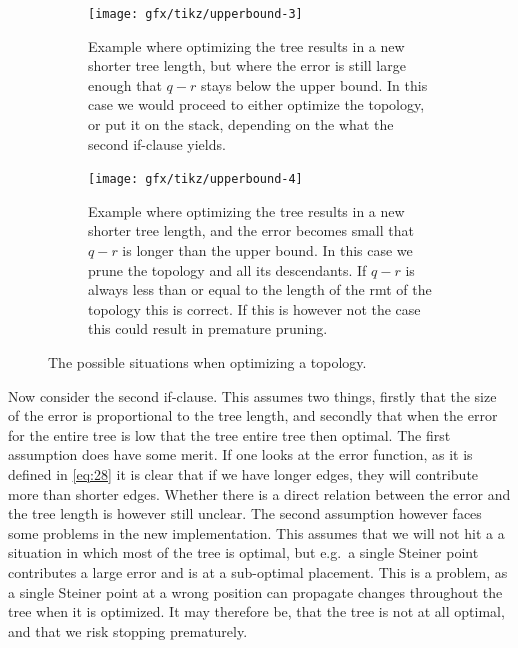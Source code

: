 \begin{figure}[htbp]
  \centering
  \begin{subfigure}[t]{0.4\textwidth}
    \texttt{[image: gfx/tikz/upperbound-3]}
    \caption{Example where optimizing the tree results in a new shorter tree length,
      but where the error is still large enough that $q-r$ stays below the upper
      bound. In this case we would proceed to either optimize the topology, or
      put it on the stack, depending on the what the second if-clause
      yields.\label{fig:upperbound-3}}
  \end{subfigure}\hspace{1em}
  \begin{subfigure}[t]{0.4\textwidth}
    \texttt{[image: gfx/tikz/upperbound-4]}
    \caption{Example where optimizing the tree results in a new shorter tree length,
      and the error becomes small that $q-r$ is longer than the upper bound. In
      this case we prune the topology and all its descendants. If $q-r$ is
      always less than or equal to the length of the \ac{rmt} of the topology
      this is correct. If this is however not the case this could result in
      premature pruning.\label{fig:upperbound-4}}
  \end{subfigure}
  \caption[Upper bounds, 3 and 4]{The possible situations when optimizing a
    topology.\label{fig:upperbound-3-4}}
\end{figure}

Now consider the second if-clause. This assumes two things, firstly that the
size of the error is proportional to the tree length, and secondly that when the
error for the entire tree is low that the tree entire tree then optimal. The
first assumption does have some merit. If one looks at the error function, as it
is defined in \cref{eq:28} it is clear that if we have longer edges, they will
contribute more than shorter edges. Whether there is a direct relation between
the error and the tree length is however still unclear. The second assumption
however faces some problems in the new implementation. This assumes that we will
not hit a a situation in which most of the tree is optimal, but e.g.\ a single
Steiner point contributes a large error and is at a sub-optimal placement. This
is a problem, as a single Steiner point at a wrong position can propagate
changes throughout the tree when it is optimized. It may therefore be, that the
tree is not at all optimal, and that we risk stopping prematurely.

